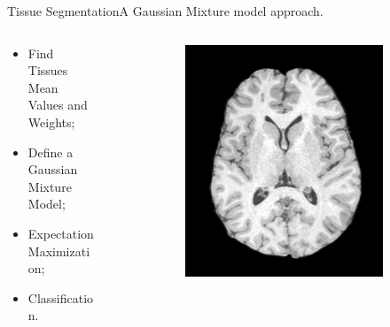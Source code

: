 \documentclass[]{standalone}
\begin{document}
	\begin{frame}{Tissue Segmentation}{A Gaussian Mixture model approach.}
	
	\vspace{-25pt}
		\begin{columns}
			\begin{column}{0.4\textwidth}
				\begin{itemize}
				\item Find Tissues Mean Values and Weights;
				\item Define a Gaussian Mixture Model;
				\item Expectation Maximization;
				\item Classification.
				\end{itemize}
			\end{column}
			\begin{column}{0.7\textwidth}
			\begin{figure}[h!]
			\centering

				\begin{subfigure}{0.45\textwidth}
					
					\includegraphics[scale=0.0551]{./IMG/brain.jpg}
				\end{subfigure}
				\hspace{15pt} %
				\hspace{-48pt}
				\begin{subfigure}{0.45\textwidth}
					

\end{subfigure}
\end{figure}
\end{column}
\end{columns}
\end{frame}
\end{document}
